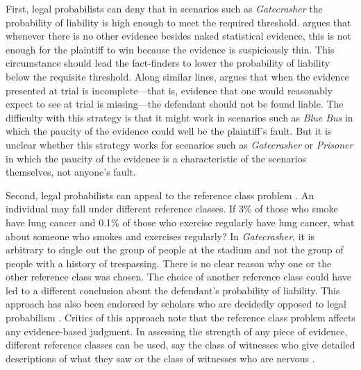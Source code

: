 \documentclass{article}
\begin{document}
First, legal probabilists can deny that in scenarios such as \textit{Gatecrasher} the probability of liability is high enough to meet the required threshold. \citet{kaye1979probability}
argues that whenever there is no other evidence besides naked statistical evidence, this is not enough 
for the plaintiff to win because the evidence is suspiciously thin. This circumstance should lead the fact-finders to lower the probability of liability below the requisite threshold.  
Along similar lines, \cite{nance2016}  argues that when the evidence presented at trial is incomplete---that is,  evidence that one would reasonably expect to see at trial is missing---the defendant should not be found liable. 
The difficulty with this strategy is that it might work in scenarios such as \textit{Blue Bus} in which the paucity of the evidence could well be the plaintiff's fault. But it is unclear whether this strategy works for scenarios such as \textit{Gatecrasher} or \textit{Prisoner} in which 
the paucity of the evidence is a characteristic 
of the scenarios themselves, not anyone's fault.  


Second, legal probabilists can appeal to the reference class problem \citep{colyvan2001crime}.
An individual may fall under different reference classes. If 3\% of those who smoke have lung cancer and 0.1\% of those who exercise regularly have lung cancer, what  about someone who smokes and exercises regularly? In \textit{Gatecrasher}, it is arbitrary to  single out the group of people at the stadium and not the group of people with a history of trespassing. There is no clear reason why one or the other reference class was chosen. %
The choice of another reference class could have led to a different conclusion about the defendant's probability of liability.
This approach has also been endorsed by 
scholars who are decidedly opposed to legal probabilism \citep{allen2007problematic}.
Critics of this approach note that the reference class problem affects any evidence-based judgment. In assessing the strength of any piece of evidence, different reference classes can be used, say the class of witnesses who give detailed descriptions of what they saw or the class of witnesses who are nervous \citep{redmayne2008exploring}. 
\end{document}
